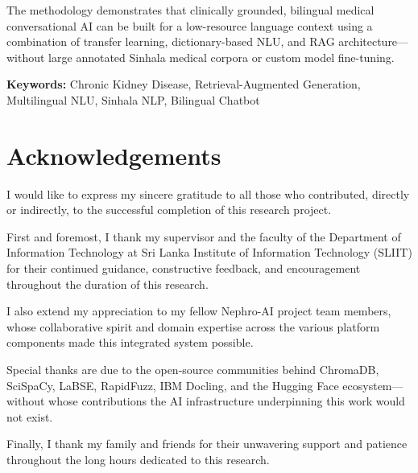 \documentclass[12pt,a4paper]{report}
\begin{document}
The methodology demonstrates that clinically grounded, bilingual medical conversational AI can be built for a low-resource language context using a combination of transfer learning, dictionary-based NLU, and RAG architecture---without large annotated Sinhala medical corpora or custom model fine-tuning.

\vspace{0.8cm}
\noindent\textbf{Keywords:} Chronic Kidney Disease, Retrieval-Augmented Generation, Multilingual NLU, Sinhala NLP, Bilingual Chatbot

\newpage
\chapter*{Acknowledgements}

I would like to express my sincere gratitude to all those who contributed, directly or indirectly, to the successful completion of this research project.

First and foremost, I thank my supervisor and the faculty of the Department of Information Technology at Sri Lanka Institute of Information Technology (SLIIT) for their continued guidance, constructive feedback, and encouragement throughout the duration of this research.

I also extend my appreciation to my fellow Nephro-AI project team members, whose collaborative spirit and domain expertise across the various platform components made this integrated system possible.

Special thanks are due to the open-source communities behind ChromaDB, SciSpaCy, LaBSE, RapidFuzz, IBM Docling, and the Hugging Face ecosystem---without whose contributions the AI infrastructure underpinning this work would not exist.

Finally, I thank my family and friends for their unwavering support and patience throughout the long hours dedicated to this research.

\tableofcontents
{}

\listoffigures
{}

\vspace{1.5cm} %
\end{document}

